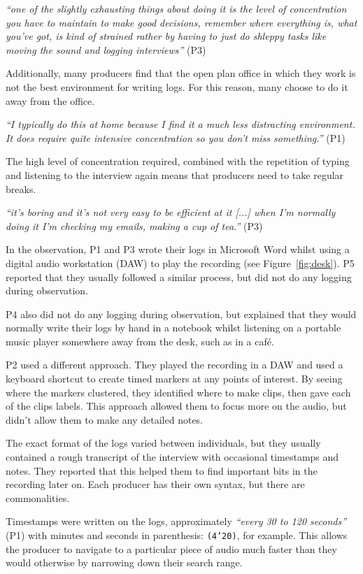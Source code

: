 \textit{``one of the slightly exhausting things about doing it is the level of
  concentration you have to maintain to make good decisions, remember where
  everything is, what you've got, is kind of strained rather by having to just
  do shleppy tasks like moving the sound and logging interviews''} (P3)

Additionally, many producers find that the open plan office in which they work
is not the best environment for writing logs. For this reason, many choose to
do it away from the office. 

\textit{``I typically do this at home because I find it a much less distracting
  environment. It does require quite intensive concentration so you don't miss
  something.''} (P1)

The high level of concentration required, combined with the repetition of 
typing and listening to the interview again means that producers need to take
regular breaks.

\textit{``it's boring and it's not very easy to be efficient at it [...] when
  I'm normally doing it I'm checking my emails, making a cup of tea.''} (P3)

In the observation, P1 and P3 wrote their logs in Microsoft Word whilst using a
digital audio workstation (DAW) to play the recording (see
Figure~\ref{fig:desk}). P5 reported that they usually followed a similar
process, but did not do any logging during observation.

P4 also did not do any logging during observation, but explained that they
would normally write their logs by hand in a notebook whilst listening on a
portable music player somewhere away from the desk, such as in a caf\'e.

P2 used a different approach. They played the recording in a DAW and used a
keyboard shortcut to create timed markers at any points of interest. By seeing
where the markers clustered, they identified where to make clips, then gave
each of the clips labels. This approach allowed them to focus more on the
audio, but didn't allow them to make any detailed notes.

The exact format of the logs varied between individuals, but they usually
contained a rough transcript of the interview with occasional timestamps and
notes. They reported that this helped them to find important bits in the
recording later on. Each producer has their own syntax, but there are
commonalities.

Timestamps were written on the logs, approximately \textit{``every 30 to 120
  seconds''} (P1) with minutes and seconds in parenthesis: \texttt{(4'20)},
for example.  This allows the producer to navigate to a particular piece of
audio much faster than they would otherwise by narrowing down their search
range.

